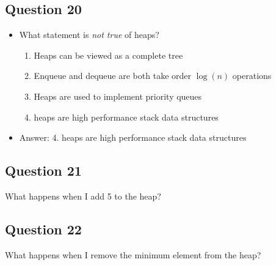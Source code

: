 \begin{slide}
\section[-1]{Question 20}

\begin{PauseHighLight}
  \begin{itemize}
  \item What statement is \emph{not true} of heaps?
    \begin{enumerate}
    \item Heaps can be viewed as a complete tree
    \item Enqueue and dequeue are both take order $\log(n)$ operations
    \item Heaps are used to implement priority queues
    \item heaps are high performance stack data structures\pause
    \end{enumerate}
  \item Answer: 4. heaps are high performance stack data structures\pauseb
  \end{itemize}
\end{PauseHighLight}
\end{slide}

\begin{slide}
\section[-1]{Question 21}

\pb
  What happens when I add 5 to the heap?\pauseh
\pauseh{}  \begin{center}
  \pause
  \end{center}
\end{slide}

\begin{slide}
\section[-1]{Question 22}

\pb
  What happens when I remove the minimum element from the heap?\pauseh
\pauseh{}  \begin{center}
  \pause
  \end{center}
\end{slide}

